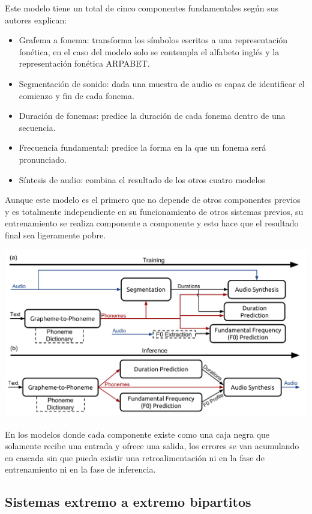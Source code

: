 Este modelo tiene un total de cinco componentes fundamentales según sus autores explican:

\begin{itemize}
    \item Grafema a fonema: transforma los símbolos escritos a una representación fonética, en el caso del modelo solo se contempla el alfabeto inglés y la representación fonética ARPABET.
    \item Segmentación de sonido: dada una muestra de audio es capaz de identificar el comienzo y fin de cada fonema.
    \item Duración de fonemas: predice la duración de cada fonema dentro de una secuencia.
    \item Frecuencia fundamental: predice la forma en la que un fonema será pronunciado.
    \item Síntesis de audio: combina el resultado de los otros cuatro modelos
\end{itemize}

Aunque este modelo es el primero que no depende de otros componentes previos y es totalmente independiente en su funcionamiento de otros sistemas previos, su entrenamiento se realiza componente a componente y esto hace que el resultado final sea ligeramente pobre. 

\begin{center}
\includegraphics[width=14cm]{4_estado_del_arte_img/deepvoice_diagram.png}
\end{center}

En los modelos donde cada componente existe como una caja negra que solamente recibe una entrada y ofrece una salida, los errores se van acumulando en cascada sin que pueda existir una retroalimentación ni en la fase de entrenamiento ni en la fase de inferencia.

\subsection{Sistemas extremo a extremo bipartitos}

